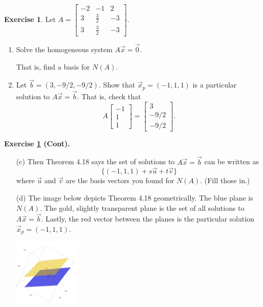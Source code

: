 \documentclass{beamer}
\newcommand{\fn}{\insertframenumber}
\theoremstyle{definition}
\newtheorem{exercise}{Exercise}
\begin{document}
\begin{frame}{\fn}
	\begin{exercise}\label{translation}
		Let $A=\left[\begin{array}{rrr}
		-2 & -1 & 2 \\
		3 & \frac{3}{2} & -3 \\
		3 & \frac{3}{2} & -3
		\end{array}\right]$.
		\begin{enumerate}[label=(\alph*)]
			\item Solve the homogeneous system $A\vec x=\vec 0$.  
			
			That is, find a basis for $N(A)$.
			\item Let $\vec b=(3, -9/2, -9/2)$.  Show that $\vec x_p = (-1,1,1)$ is a particular solution to $A\vec x=\vec b$.
			That is, check that
			\[A\begin{bmatrix}-1\\1\\1\end{bmatrix}=\begin{bmatrix}3\\-9/2\\-9/2\end{bmatrix}.\]
			
		\end{enumerate}
	\end{exercise}
	\end{frame}
\begin{frame}{\fn}
	\begin{block}{\textbf{Exercise \ref{translation} (Cont).}}
		\begin{enumerate}[label=(\alph*)]
			\item[(c)] Then Theorem 4.18 says the set of solutions to $A\vec x =\vec b$ can be written as
			\[\{(-1,1,1)+s\vec u+ t\vec v\}\]
			where $\vec u$ and $\vec v$ are the basis vectors you found for $N(A)$. (Fill those in.)
			\item[(d)] The image below depicts Theorem 4.18 geometrically.  The blue plane is $N(A)$.  The gold, slightly transparent plane is the set of all solutions to $A\vec x=\vec b$.  Lastly, the red vector between the planes is the particular solution $\vec x_p=(-1,1,1)$.
			\begin{center}
				\includegraphics[width=1.25in]{images/solution_set}
			\end{center}
		\end{enumerate}
	\end{block}
\end{frame}
\end{document}
